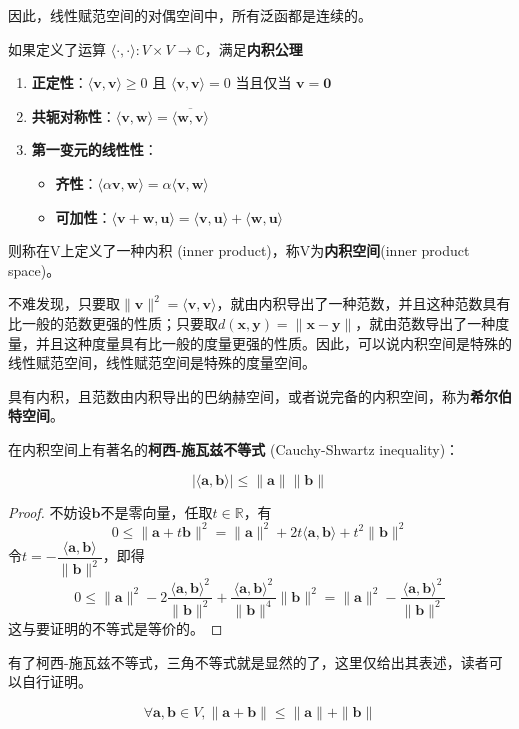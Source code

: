 因此，线性赋范空间的对偶空间中，所有泛函都是连续的。

\begin{definition}[内积]
    如果定义了运算
$\langle \cdot,\cdot\rangle:V\times V\rightarrow \mathbb{C} $，满足\textbf{内积公理}
\begin{enumerate}
    \item \textbf{正定性}：$\langle \mathbf{v}, \mathbf{v} \rangle \geq 0$ 且 $\langle \mathbf{v}, \mathbf{v} \rangle = 0$ 当且仅当 $\mathbf{v} = \mathbf{0}$
    \item \textbf{共轭对称性}：$\langle \mathbf{v}, \mathbf{w} \rangle = \overline{\langle \mathbf{w}, \mathbf{v} \rangle}$
    \item \textbf{第一变元的线性性}：
          \begin{itemize}
              \item \textbf{齐性}：$\langle \alpha \mathbf{v}, \mathbf{w} \rangle = \alpha \langle \mathbf{v}, \mathbf{w} \rangle$
              \item \textbf{可加性}：$\langle \mathbf{v} + \mathbf{w}, \mathbf{u} \rangle = \langle \mathbf{v}, \mathbf{u} \rangle + \langle \mathbf{w}, \mathbf{u} \rangle$
          \end{itemize}
\end{enumerate}
则称在V上定义了一种内积 (inner product)，称V为\textbf{内积空间}(inner product space)。
\end{definition}

不难发现，只要取$\|\mathbf{v}\|^2=\langle \mathbf{v}, \mathbf{v} \rangle$，就由内积导出了一种范数，并且这种范数具有比一般的范数更强的性质；只要取$d(\mathbf{x},\mathbf{y})=\|\mathbf{x-y}\|$，就由范数导出了一种度量，并且这种度量具有比一般的度量更强的性质。因此，可以说内积空间是特殊的线性赋范空间，线性赋范空间是特殊的度量空间。

\begin{definition}[希尔伯特空间]
    具有内积，且范数由内积导出的巴纳赫空间，或者说完备的内积空间，称为\textbf{希尔伯特空间}。
\end{definition}

在内积空间上有著名的\textbf{柯西-施瓦兹不等式} (Cauchy-Shwartz inequality)：
\begin{theorem}[柯西-施瓦兹不等式]
    \[|\langle \mathbf{a,b}\rangle| \leq \| \mathbf{a}\| \| \mathbf{b}\| \]
\end{theorem}
\begin{proof}
不妨设$\mathbf{b}$不是零向量，任取$t\in \mathbb{R}$，有
\[0\leq \|\mathbf{a}+t\mathbf{b}\|^2=\|\mathbf{a}\|^2+2t\langle\mathbf{a,b}\rangle +t^2\|\mathbf{b}\|^2\]
令$t=-\dfrac{\langle\mathbf{a,b}\rangle}{\|\mathbf{b}\|^2}$，即得
\[0\leq \|\mathbf{a}\|^2-2\frac{\langle\mathbf{a,b}\rangle^2}{\|\mathbf{b}\|^2} +\frac{\langle\mathbf{a,b}\rangle^2}{\|\mathbf{b}\|^4}\|\mathbf{b}\|^2=\|\mathbf{a}\|^2-\frac{\langle\mathbf{a,b}\rangle^2}{\|\mathbf{b}\|^2}\]
这与要证明的不等式是等价的。
\end{proof} 
有了柯西-施瓦兹不等式，三角不等式就是显然的了，这里仅给出其表述，读者可以自行证明。
\begin{proposition}[三角不等式]
    \[\forall \mathbf{a,b}\in V,\|\mathbf{a+b}\|\leq\|\mathbf{a}\|+\|\mathbf{b}\|\]
\end{proposition}


